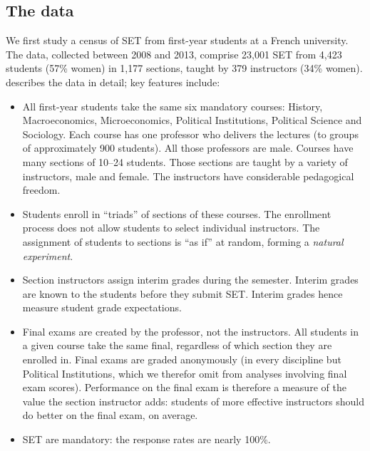 \documentclass[12pt]{article}
\begin{document}
\subsection{The data}

We first study a census of SET from first-year students at a French university.
The data, collected between 2008 and 2013, comprise 23,001 SET from
4,423 students (57\% women) in 1,177
sections, taught by 379 instructors (34\% women). 
\citet{Boring2015} describes the data in detail; key features include:
\begin{itemize}
   \item All first-year students take the same six mandatory courses: 
            History, Macroeconomics, Microeconomics, 
            Political Institutions, Political Science and Sociology.
            Each course has one professor
            who delivers the lectures (to groups of approximately 900 students). 
            All those professors are male.
            Courses have many sections of 10--24 students. 
            Those sections are taught by a variety of instructors, male and female.
            The instructors have considerable pedagogical freedom.
    
   \item Students enroll in ``triads'' of sections of these courses. 
            The enrollment process
            does not allow students to select individual instructors.
            The assignment of students to sections is ``as if'' at random,
            forming a \emph{natural experiment}.
            
   \item Section instructors assign interim grades during the semester.
            Interim grades are known to the students before they submit SET.
            Interim grades hence measure student grade expectations.
            
   \item Final exams are created by the professor, not the instructors.
            All students in a given course take the same final, regardless of which section they
            are enrolled in.
            Final exams are graded anonymously (in every discipline but Political
            Institutions, which we therefor omit from analyses involving final exam scores).
            Performance on the final exam is therefore a measure of the value the
            section instructor adds: students of more effective instructors should do better on
            the final exam, on average.
    
   \item SET are mandatory: the response rates are nearly 100\%.
   
\end{itemize}
\end{document}
